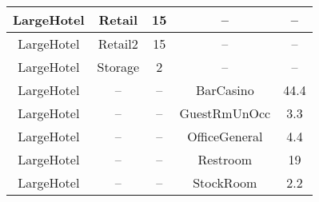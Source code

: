 \begin{table}
\begin{tabular}{|c|c|c|c|c|}
LargeHotel             & Retail                  & 15                                                                                                            & --                                & --                                                                                                             \\ \hline
LargeHotel             & Retail2                 & 15                                                                                                            & --                                & --                                                                                                             \\ \hline
LargeHotel             & Storage                 & 2                                                                                                             & --                                & --                                                                                                             \\ \hline
LargeHotel             & --                      & --                                                                                                            & BarCasino                         & 44.4                                                                                                           \\ \hline
LargeHotel             & --                      & --                                                                                                            & GuestRmUnOcc                      & 3.3                                                                                                            \\ \hline
LargeHotel             & --                      & --                                                                                                            & OfficeGeneral                     & 4.4                                                                                                            \\ \hline
LargeHotel             & --                      & --                                                                                                            & Restroom                          & 19                                                                                                             \\ \hline
LargeHotel             & --                      & --                                                                                                            & StockRoom                         & 2.2                                                                                                            \\ \hline

\end{tabular}
\end{table}
